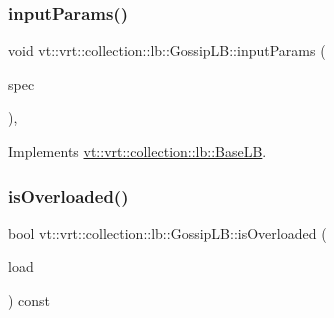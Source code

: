 \mbox{\label{structvt_1_1vrt_1_1collection_1_1lb_1_1_gossip_l_b_abc000890ad1743faae2fe853d73485bb}} 
\subsubsection{\texorpdfstring{input\+Params()}{inputParams()}}
{\footnotesize\ttfamily void vt\+::vrt\+::collection\+::lb\+::\+Gossip\+L\+B\+::input\+Params (\begin{DoxyParamCaption}\item[{\hyperlink{structvt_1_1vrt_1_1collection_1_1balance_1_1_spec_entry}{balance\+::\+Spec\+Entry} $\ast$}]{spec }\end{DoxyParamCaption})\hspace{0.3cm}{\ttfamily [override]}, {\ttfamily [virtual]}}



Implements \hyperlink{structvt_1_1vrt_1_1collection_1_1lb_1_1_base_l_b_a555e29aadfd428383464d6dd007506b6}{vt\+::vrt\+::collection\+::lb\+::\+Base\+LB}.

\mbox{\label{structvt_1_1vrt_1_1collection_1_1lb_1_1_gossip_l_b_a8bbe18748b6dd4b5269e6abfed5c6f99}} 
\subsubsection{\texorpdfstring{is\+Overloaded()}{isOverloaded()}}
{\footnotesize\ttfamily bool vt\+::vrt\+::collection\+::lb\+::\+Gossip\+L\+B\+::is\+Overloaded (\begin{DoxyParamCaption}\item[{\hyperlink{structvt_1_1vrt_1_1collection_1_1lb_1_1_base_l_b_a215e22b9f12678303f49615ae3be05cc}{Load\+Type}}]{load }\end{DoxyParamCaption}) const\hspace{0.3cm}{\ttfamily [protected]}}

